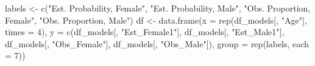 \documentclass[
  letterpaper,
  DIV=11,
  numbers=noendperiod]{scrreprt}
\newenvironment{Shaded}{\begin{snugshade}}{\end{snugshade}}
\newcommand{\AttributeTok}[1]{\textcolor[rgb]{0.40,0.45,0.13}{#1}}
\newcommand{\DecValTok}[1]{\textcolor[rgb]{0.68,0.00,0.00}{#1}}
\newcommand{\FunctionTok}[1]{\textcolor[rgb]{0.28,0.35,0.67}{#1}}
\newcommand{\NormalTok}[1]{\textcolor[rgb]{0.00,0.23,0.31}{#1}}
\newcommand{\OtherTok}[1]{\textcolor[rgb]{0.00,0.23,0.31}{#1}}
\newcommand{\StringTok}[1]{\textcolor[rgb]{0.13,0.47,0.30}{#1}}
\begin{document}
\begin{Shaded}
\begin{Highlighting}[]
\NormalTok{labels }\OtherTok{\textless{}{-}} \FunctionTok{c}\NormalTok{(}\StringTok{"Est. Probability, Female"}\NormalTok{, }\StringTok{"Est. Probability, Male"}\NormalTok{, }\StringTok{"Obs. Proportion, Female"}\NormalTok{,}
    \StringTok{"Obs. Proportion, Male"}\NormalTok{)}
\NormalTok{df }\OtherTok{\textless{}{-}} \FunctionTok{data.frame}\NormalTok{(}\AttributeTok{x =} \FunctionTok{rep}\NormalTok{(df\_models[, }\StringTok{"Age"}\NormalTok{], }\AttributeTok{times =} \DecValTok{4}\NormalTok{), }\AttributeTok{y =} \FunctionTok{c}\NormalTok{(df\_models[, }\StringTok{"Est\_Female1"}\NormalTok{],}
\NormalTok{    df\_models[, }\StringTok{"Est\_Male1"}\NormalTok{], df\_models[, }\StringTok{"Obs\_Female"}\NormalTok{], df\_models[, }\StringTok{"Obs\_Male"}\NormalTok{]),}
    \AttributeTok{group =} \FunctionTok{rep}\NormalTok{(labels, }\AttributeTok{each =} \DecValTok{7}\NormalTok{))}


\end{Highlighting}
\end{Shaded}
\end{document}
